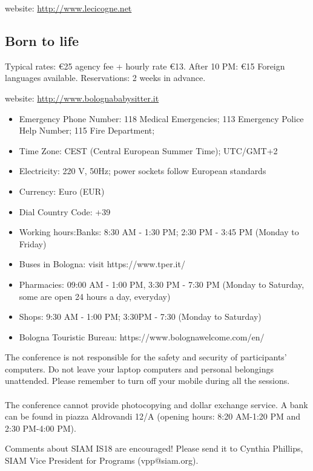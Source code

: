 \smallskip\noindent website: \href{http://www.lecicogne.net}{http://www.lecicogne.net}

\subsection*{Born to life}
Typical rates: \euro 25 agency fee + hourly rate \euro 13. After 10 PM: \euro 15 Foreign languages available. Reservations: 2 weeks in advance.

\smallskip\noindent website: \href{http://www.bolognababysitter.it}{http://www.bolognababysitter.it}


\begin{itemize}
  \item Emergency Phone Number: 118 Medical Emergencies; 113 Emergency Police Help Number; 115 Fire Department; 
  \item Time Zone: CEST (Central European Summer Time); UTC/GMT+2
  \item Electricity: 220 V, 50Hz; power sockets follow European standards
  \item Currency: Euro (EUR)
  \item Dial Country Code: +39
  \item Working hours:Banks: 8:30 AM - 1:30 PM; 2:30 PM - 3:45 PM (Monday to Friday) 
  \item Buses in Bologna: visit https://www.tper.it/ 
  \item Pharmacies: 09:00 AM - 1:00 PM, 3:30 PM - 7:30 PM (Monday to Saturday, some are open 24 hours a day, everyday) 
  \item Shops: 9:30 AM - 1:00 PM; 3:30PM - 7:30 (Monday to Saturday) 
  \item Bologna Touristic Bureau: https://www.bolognawelcome.com/en/
\end{itemize}

The conference is not responsible for the safety and security of participants' computers. Do not leave your laptop computers and personal belongings unattended. Please remember to turn off your mobile during all the sessions.\\\\ The conference cannot provide photocopying and dollar exchange service. A bank can be found in piazza Aldrovandi 12/A (opening hours: 8:20 AM-1:20 PM and 2:30 PM-4:00 PM).

Comments about SIAM IS18 are encouraged! Please send it to Cynthia Phillips, SIAM Vice President for Programs (vpp@siam.org).
